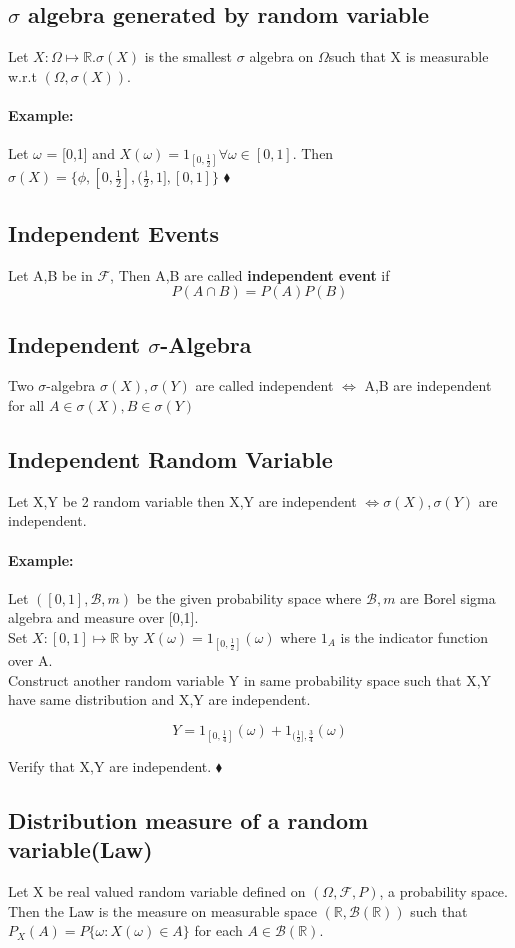 \documentclass{article}
\newenvironment{example}{\paragraph{Example:}}{\hfill $\blacklozenge $}
\begin{document}
\subsection{$\sigma$ algebra generated by random variable}
Let $X: \Omega \mapsto \mathbb{R}. \sigma (X)$ is the smallest $\sigma$ algebra on $\Omega$such that X is measurable w.r.t $(\Omega, \sigma (X))$.
\begin{example}
    Let $\omega$ = [0,1] and $X(\omega)=1_{[0,\frac{1}{2}]} \forall \omega \in [0,1]$. Then $\sigma(X) = \{ \phi , [0,\frac{1}{2}] , (\frac{1}{2},1] , [0,1] \}$
\end{example}  
\subsection{Independent Events}
Let A,B be in $\mathcal{F} $, Then A,B are called \textbf{independent event } if $$P(A\cap B) = P(A)P(B)$$

\subsection{Independent $\sigma $-Algebra }
Two $\sigma $-algebra $\sigma(X),\sigma (Y)$ are called independent $\iff $ A,B are independent for all $A \in \sigma(X),  B \in \sigma (Y)$
\subsection{Independent Random Variable }
Let X,Y be 2 random variable then X,Y are independent $\iff \sigma(X) , \sigma(Y)$ are independent.  
 \begin{example}
    Let $([0,1],\mathcal{B},m )$ be the given probability space where $\mathcal{B} , m$ are Borel sigma algebra and measure over [0,1]. \\
    Set $X: [0,1] \mapsto \mathbb{R} $ by $X(\omega) = 1_{[0,\frac{1}{2}]} (\omega)$ where $1_A$ is the indicator function over A.
    \\ Construct another random variable Y in same probability space such that X,Y have same distribution and X,Y are independent.    

    $$Y = 1_{[0,\frac{1}{4}]}(\omega) + 1_{(\frac{1}{2}], \frac{3}{4}}(\omega)$$
 
Verify that X,Y are independent. 
\end{example}
\subsection{Distribution measure of a random variable(Law)}
Let X be real valued random variable defined on $(\Omega, \mathcal{F} ,P)$, a probability space. Then the Law is the measure on measurable space $(\mathbb{R}, \mathcal{B}(\mathbb{R}) )$ such that $P_X(A) = P\{\omega : X(\omega) \in A \}$ for each $A \in \mathcal{B}(\mathbb{R}) $.
\end{document}

